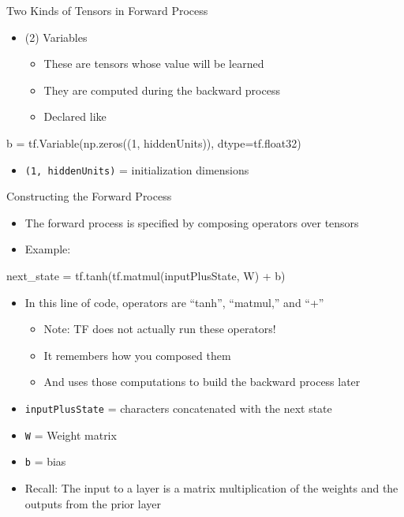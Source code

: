\documentclass[aspectratio=169]{beamer}
\begin{document}
\begin{frame}[fragile]{Two Kinds of Tensors in Forward Process}

\begin{itemize}
\item (2) Variables
\begin{itemize}
\item These are tensors whose value will be learned
\item They are computed during the backward process
\item Declared like 
\end{itemize}
\end{itemize}
\begin{SQL} 
b = tf.Variable(np.zeros((1, hiddenUnits)), dtype=tf.float32)
\end{SQL}
\begin{itemize}
\item \texttt{(1, hiddenUnits)} = initialization dimensions
\end{itemize}
\end{frame}
\begin{frame}[fragile]{Constructing the Forward Process}

\begin{itemize}
\item The forward process is specified by composing operators over tensors
\item Example:
\end{itemize}
	\begin{SQL}
next_state = tf.tanh(tf.matmul(inputPlusState, W) + b)	
	\end{SQL}
	\begin{itemize}
	\item In this line of code, operators are ``tanh'', ``matmul,'' and ``+''
	\begin{itemize}
	\item Note: TF does not actually run these operators!
	\item It remembers how you composed them
	\item And uses those computations to build the backward process later
\end{itemize}
\item \texttt{inputPlusState} = characters concatenated with the next state
\item \texttt{W} = Weight matrix
\item \texttt{b} = bias
\item Recall: The input to a layer is a matrix multiplication of the weights and the outputs from the prior layer

	\end{itemize}

\end{frame}
\end{document}
